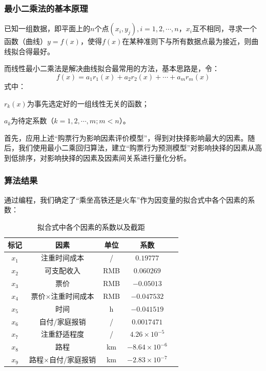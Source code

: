 \documentclass{ctexart}
\renewcommand\arraystretch{1.5}
\newcounter{sub}
\begin{document}
\subsubsection{最小二乘法的基本原理}
已知一组数据，即平面上的$n$个点$(x_i,y_j),i=1,2, \cdots ,n$，$x_i$互不相同，寻求一个函数（曲线）$y=f(x)$，使得$f(x)$在某种准则下与所有数据点最为接近，则曲线拟合得最好。

而线性最小二乘法是解决曲线拟合最常用的方法，基本思路是，令：
\begin{equation}
	f(x)=a_1r_1(x)+a_2r_2(x)+ \cdots + a_mr_m(x)
\end{equation}
式中：

$r_k(x)$为事先选定好的一组线性无关的函数；

$a_k$为待定系数（$k=1,2,\cdots ,m;m<n$）。

首先，应用上述\enquote{购票行为影响因素评价模型}，得到对抉择影响最大的因素。随后，我们使用最小二乘回归算法，建立\enquote{购票行为预测模型}对影响抉择的因素从高到低排序，对影响抉择的因素及因素间关系进行量化分析。

\subsubsection{算法结果}
通过编程，我们确定了\enquote{乘坐高铁还是火车}作为因变量的拟合式中各个因素的系数：
\begin{table}[H]
	\centering
	\caption{拟合式中各个因素的系数以及截距}
	\renewcommand\arraystretch{1.4}

	\begin{tabular}{ccccp{13em}}
		\toprule
		标记&因素&单位&系数\\
		\midrule
		$x_1$&	注重时间成本&/&$0.19777$\\
		$x_2$&	可支配收入&RMB&	$0.060269$\\
		$x_3$&	票价&RMB&$	-0.05013$\\
		$x_4$&	票价$\times$注重时间成本&RMB&	$-0.047532$\\
		$x_5$&	时间&h&	$-0.041519$\\
		$x_6$&	自付/家庭报销&/&	$0.0017471$\\
		$x_7$&	注重舒适程度&/&	$4.26\times 10^{-5}$\\
		$x_8$&	路程&km&	$-8.64\times 10^{-6}$\\
		$x_9$&	路程$\times$自付/家庭报销&km&	$-2.83\times 10^{-7}$\\
		\bottomrule
	\end{tabular}
	\label{com}
\end{table}
\end{document}
